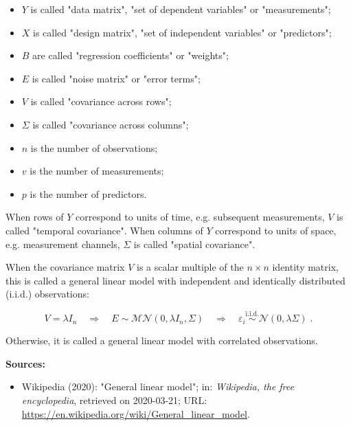 \documentclass[a4paper,12pt,twoside]{book}
\begin{document}
\begin{itemize}

\item $Y$ is called "data matrix", "set of dependent variables" or "measurements";

\item $X$ is called "design matrix", "set of independent variables" or "predictors";

\item $B$ are called "regression coefficients" or "weights";

\item $E$ is called "noise matrix" or "error terms";

\item $V$ is called "covariance across rows";

\item $\Sigma$ is called "covariance across columns";

\item $n$ is the number of observations;

\item $v$ is the number of measurements;

\item $p$ is the number of predictors.

\end{itemize}

When rows of $Y$ correspond to units of time, e.g. subsequent measurements, $V$ is called "temporal covariance". When columns of $Y$ correspond to units of space, e.g. measurement channels, $\Sigma$ is called "spatial covariance".

When the covariance matrix $V$ is a scalar multiple of the $n \times n$ identity matrix, this is called a general linear model with independent and identically distributed (i.i.d.) observations:

\begin{equation} \label{eq:glm-glm-iid}
V = \lambda I_n \quad \Rightarrow \quad E \sim \mathcal{MN}(0, \lambda I_n, \Sigma) \quad \Rightarrow \quad \varepsilon_i \overset{\text{i.i.d.}}{\sim} \mathcal{N}(0, \lambda \Sigma) \; .
\end{equation}

Otherwise, it is called a general linear model with correlated observations.


\vspace{1em}
\textbf{Sources:}
\begin{itemize}
\item Wikipedia (2020): "General linear model"; in: \textit{Wikipedia, the free encyclopedia}, retrieved on 2020-03-21; URL: \url{https://en.wikipedia.org/wiki/General_linear_model}.
\end{itemize}
\end{document}
